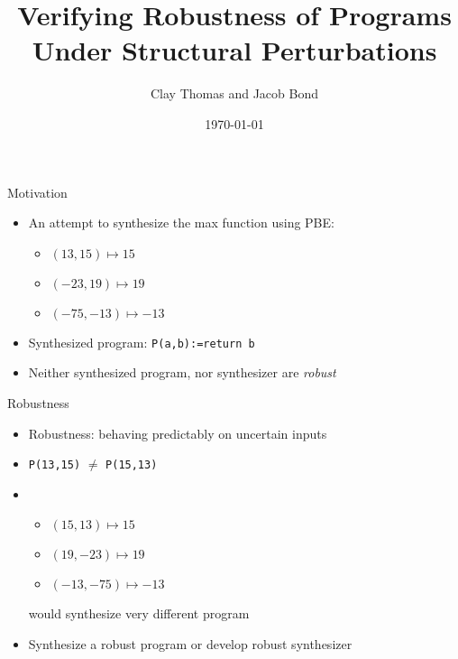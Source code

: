 \documentclass[usenames,dvipsnames]{beamer}
\title{Verifying Robustness of Programs Under Structural Perturbations}
\author{Clay Thomas and Jacob Bond}
\date{\today}
\begin{document}

\begin{frame}
  \titlepage
\end{frame}

\begin{frame}[fragile]{Motivation}
    \begin{itemize}
        \item<1-> An attempt to synthesize the max function using PBE:
            \begin{itemize}
                \item \((13, 15) \mapsto 15\)
                \item \((-23, 19) \mapsto 19\)
                \item \((-75, -13) \mapsto -13\)
            \end{itemize}
        \item<2-> Synthesized program: \verb!P(a,b):=return b!
        \item<3-> Neither synthesized program, nor synthesizer are {\it robust}
    \end{itemize}
\end{frame}

\begin{frame}[fragile]{Robustness}
    \begin{itemize}
        \item<1-> Robustness: behaving predictably on uncertain inputs \cite{chaudhuri12}
        \item<2-> \verb!P(13,15)! \(\not=\) \verb!P(15,13)!
        \item<3-> 
            \begin{itemize}
                \item \((15, 13) \mapsto 15\)
                \item \((19, -23) \mapsto 19\)
                \item \((-13, -75) \mapsto -13\)
            \end{itemize}
            would synthesize very different program
        \item<4-> Synthesize a robust program or develop robust synthesizer
    \end{itemize}
\end{frame}
\end{document}
